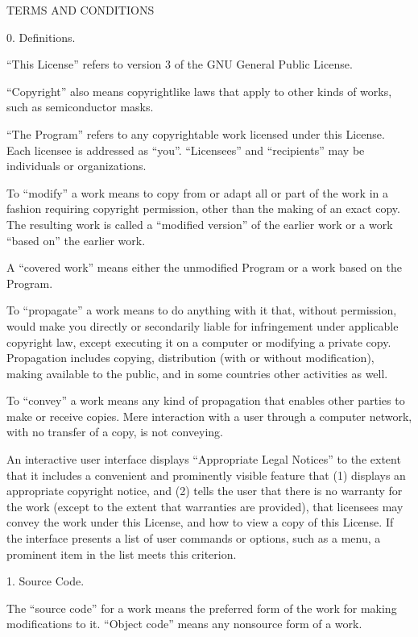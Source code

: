 \documentclass[letterpaper,10pt,english]{sphinxmanual}
\begin{document}
\begin{sphinxVerbatim}[commandchars=\\\{\}]
 TERMS AND CONDITIONS

 0. Definitions.

   “This License” refers to version 3 of the GNU General Public License.

   “Copyright” also means copyright\PYGZhy{}like laws that apply to other kinds of
   works, such as semiconductor masks.

   “The Program” refers to any copyrightable work licensed under this
   License. Each licensee is addressed as “you”. “Licensees” and “recipients”
   may be individuals or organizations.

   To “modify” a work means to copy from or adapt all or part of the work in a
   fashion requiring copyright permission, other than the making of an exact
   copy. The resulting work is called a “modified version” of the earlier work
   or a work “based on” the earlier work.

   A “covered work” means either the unmodified Program or a work based on the
   Program.

   To “propagate” a work means to do anything with it that, without permission,
   would make you directly or secondarily liable for infringement under
   applicable copyright law, except executing it on a computer or modifying a
   private copy. Propagation includes copying, distribution (with or without
   modification), making available to the public, and in some countries other
   activities as well.

   To “convey” a work means any kind of propagation that enables other parties
   to make or receive copies. Mere interaction with a user through a computer
   network, with no transfer of a copy, is not conveying.

   An interactive user interface displays “Appropriate Legal Notices” to the
   extent that it includes a convenient and prominently visible feature
   that (1) displays an appropriate copyright notice, and (2) tells the user
   that there is no warranty for the work (except to the extent that warranties
   are provided), that licensees may convey the work under this License, and
   how to view a copy of this License. If the interface presents a list of user
   commands or options, such as a menu, a prominent item in the list meets this
   criterion.

 1. Source Code.

   The “source code” for a work means the preferred form of the work for making
   modifications to it. “Object code” means any non\PYGZhy{}source form of a work.


\end{sphinxVerbatim}
\end{document}
